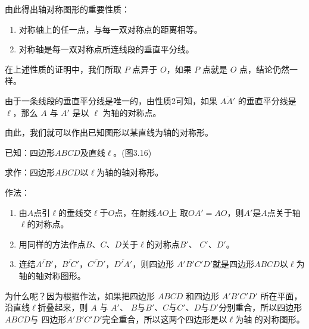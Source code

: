 由此得出轴对称图形的重要性质：
\begin{enumerate}
  \item 对称轴上的任一点，与每一双对称点的距离相等。
  \item 对称轴是每一双对称点所连线段的垂直平分线。
\end{enumerate}

在上述性质的证明中，我们所取 $P$ 点异于 $O$，如果 $P$ 点就是 $O$ 点，结论仍然一样。

由于一条线段的垂直平分线是唯一的，由性质2可知，如果 $\overline{AA'}$ 的垂直平分线是 $\ell$，那么 $A$ 与 $A'$ 是以 $\ell$ 为轴的对称点。

由此，我们就可以作出已知图形以某直线为轴的对称形。

\begin{figure}
    \begin{minipage}[t]{0.48\linewidth}
    \centering
{}
    \caption{}
    \end{minipage}
    \begin{minipage}[t]{0.48\linewidth}
    \centering
    \begin{tikzpicture}[>=latex, scale=1]
    \end{tikzpicture}
    \caption{}
    \end{minipage}
    \end{figure}



\begin{example}
已知：四边形$ABCD$及直线$\ell$。(图3.16)

求作：四边形$ABCD$以$\ell$为轴的轴对称形。

作法：
\begin{enumerate}
\item 由$A$点引$\ell$的垂线交$\ell$于$O$点，在射线$AO$上
取$OA'=AO$，则$A'$是$A$点关于轴$\ell$的对称点。
\item 用同样的方法作点$B$、$C$、$D$关于$\ell$的对称点$B'$、
$C'$、$D'$。
\item 连结$\overline{A'B'}$，$\overline{B'C'}$，$\overline{C'D'}$，$\overline{D'A'}$，则四边形
$A'B'C'D'$就是四边形$ABCD$以$\ell$为轴的轴对称图形。
\end{enumerate}

为什么呢？因为根据作法，如果把四边形 $ABCD$ 和四边形 $A'B'C'D'$ 所在平面，沿直线$\ell$折叠起来，则 $A$ 与 $A'$、
$B$与$B'$、$C$与$C'$、$D$与$D'$分别重合，所以四边形$ABCD$与
四边形$A'B'C'D'$完全重合，所以这两个四边形是以$\ell$为轴
的对称图形。
\end{example}

